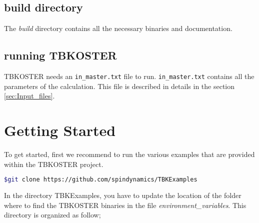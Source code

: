 \documentclass[12pt, onecolumn]{memoir}
\newcommand{\TBK}{\textcolor{nicered}{TBKOSTER}}
\begin{document}
\section{build directory}

The \textit{build} directory contains all the necessary binaries and documentation.

\section{running TBKOSTER}
\label{sec:Running}

{\TBK} needs an \verb+in_master.txt+ file to run. 
\verb+in_master.txt+ contains all the parameters of the calculation. 
This file is described in details in the section \ref{sec:Input_files}.

\vfil
\pagebreak

\chapter{Getting Started}
\label{sec:Getting_Started}

To get started, first we recommend to run the various examples that are provided within the TBKOSTER project.
\begin{lstlisting}[language=bash,basicstyle=\small\ttfamily,frame=single,breaklines=true]
$git clone https://github.com/spindynamics/TBKExamples 
\end{lstlisting}
In the directory TBKExamples, you have to update the location of the folder where to find the TBKOSTER binaries in the file 
\textit{environment\_variables}.
This directory is organized as follow;

\vspace{0.5cm}

\noindent
{}
\end{document}
